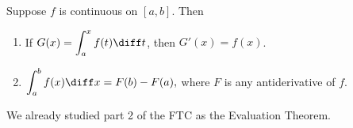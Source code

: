 \begin{frame}
\begin{theorem}
Suppose $f$ is continuous on $[a, b]$.  Then 
\begin{enumerate}
\item  If $G(x) = \displaystyle \int_a^x f(t) \diff t$, then $G'(x) = f(x)$.  
\item  $\displaystyle \int_a^b f(x) \diff x = F(b) - F(a),$ where $F$ is any antiderivative of $f$.
\end{enumerate}
\end{theorem}
We already studied part 2 of the FTC as the Evaluation Theorem.
\end{frame}
